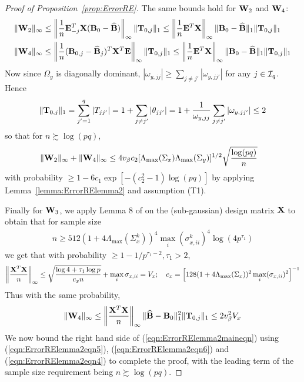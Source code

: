 \documentclass[12pt, letterpaper]{article}
\theoremstyle{definition}
\numberwithin{equation}{section}
\begin{document}
\begin{proof}[Proof of Proposition~\ref{prop:ErrorRE}]
The same bounds hold for ${\mathbf{W}}_2$ and ${\mathbf{W}}_4$:
%
\begin{align*}
\| {\mathbf{W}}_2 \|_\infty & \leq \left\| \frac{1}{n} {\mathbf{E}}_{-j}^T {\mathbf{X}} ({\mathbf{B}}_0 - \widehat {{\mathbf{B}}}) \right\|_\infty \| {\mathbf{T}}_{0,j} \|_1 \leq
\left\| \frac{1}{n} {\mathbf{E}}^T {\mathbf{X}} \right\|_\infty \| {\mathbf{B}}_0 - \widehat {{\mathbf{B}}} \|_1 \| {\mathbf{T}}_{0,j} \|_1\\
\| {\mathbf{W}}_4 \|_\infty & \leq \left\| \frac{1}{n} ({\mathbf{B}}_{0,j} - \widehat {{\mathbf{B}}}_j)^T {\mathbf{X}}^T {\mathbf{E}} \right\|_\infty \| {\mathbf{T}}_{0,j} \|_1 \leq
\left\| \frac{1}{n} {\mathbf{E}}^T {\mathbf{X}} \right\|_\infty \| {\mathbf{B}}_0 - \widehat {{\mathbf{B}}} \|_1 \| {\mathbf{T}}_{0,j} \|_1\\
\end{align*}
%
Now since $\Omega_y$ is diagonally dominant, $|\omega_{y,jj}| \geq \sum_{j \neq j'} |\omega_{y,jj'}|$ for any $j \in {\cal{I}}_q$. Hence
%
$$
\| {\mathbf{T}}_{0,j} \|_1 = \sum_{j'=1}^q | T_{jj'} | = 1 + \sum_{j \neq j'} | \theta_{jj'} | = 1 + \frac{1}{\omega_{y,jj}} \sum_{j \neq j'} | \omega_{y,jj'} | \leq 2
$$
%
so that for $n \succsim \log (pq)$,
%
\begin{align}\label{eqn:ErrorRElemma2eqn6}
\| {\mathbf{W}}_2 \|_\infty + \| {\mathbf{W}}_4 \|_\infty  & \leq
4 v_\beta c_2 [ \Lambda_{\max} (\Sigma_x) \Lambda_{\max} (\Sigma_y) ]^{1/2} \sqrt{\frac{ \log(pq)}{n}}
\end{align}
%
with probability $\geq 1 - 6c_1 \exp [-(c_2^2-1) \log(pq)]$ by applying Lemma~\ref{lemma:ErrorRElemma2} and assumption (T1).

Finally for ${\mathbf{W}}_3$, we apply Lemma 8 of \cite{RavikumarEtal11} on the (sub-gaussian) design matrix ${\mathbf{X}}$ to obtain that for sample size
%
\begin{align}\label{eqn:ErrorRElemma2eqn7}
n \geq 512 ( 1 + 4 \Lambda_{\max} (\Sigma_x^k))^4 \max_i (\sigma_{x,ii}^k )^4 \log (4p^{\tau_1})
\end{align}
%
we get that with probability $ \geq 1 - 1/p^{\tau_1-2}, \tau_1 > 2$,
%
$$
\left\| \frac{{\mathbf{X}}^T {\mathbf{X}}}{n} \right\|_\infty \leq \sqrt{ \frac{ \log 4 + \tau_1 \log p}{c_x n}} + \max_i \sigma_{x,ii} = V_x; \quad
c_x = \left[ 128 ( 1 + 4 \Lambda_{\max} (\Sigma_x)  )^2 \max_i (\sigma_{x,ii})^2 \right]^{-1}
$$
%
Thus with the same probability,
%
\begin{align}\label{eqn:ErrorRElemma2eqn4}
\| {\mathbf{W}}_4 \|_\infty \leq \left\| \frac{{\mathbf{X}}^T {\mathbf{X}}}{n} \right\|_\infty \| \widehat {{\mathbf{B}}} - {\mathbf{B}}_0 \|_1^2 \| {\mathbf{T}}_{0,j} \|_1 
\leq 2 v_\beta^2 V_x
\end{align}
%
We now bound the right hand side of (\ref{eqn:ErrorRElemma2maineqn}) using (\ref{eqn:ErrorRElemma2eqn5}), (\ref{eqn:ErrorRElemma2eqn6}) and (\ref{eqn:ErrorRElemma2eqn4}) to complete the proof, with the leading term of the sample size requirement being $n \succsim \log(pq)$.


\end{proof}
\end{document}

